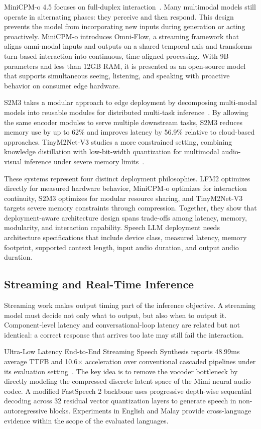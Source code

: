 MiniCPM-o 4.5 focuses on full-duplex interaction~\citep{cui2026minicpmo}. Many multimodal models still operate in alternating phases: they perceive and then respond. This design prevents the model from incorporating new inputs during generation or acting proactively. MiniCPM-o introduces Omni-Flow, a streaming framework that aligns omni-modal inputs and outputs on a shared temporal axis and transforms turn-based interaction into continuous, time-aligned processing. With 9B parameters and less than 12GB RAM, it is presented as an open-source model that supports simultaneous seeing, listening, and speaking with proactive behavior on consumer edge hardware.

S2M3 takes a modular approach to edge deployment by decomposing multi-modal models into reusable modules for distributed multi-task inference~\citep{yoon2025s2m3}. By allowing the same encoder modules to serve multiple downstream tasks, S2M3 reduces memory use by up to 62\% and improves latency by 56.9\% relative to cloud-based approaches. TinyM2Net-V3 studies a more constrained setting, combining knowledge distillation with low-bit-width quantization for multimodal audio-visual inference under severe memory limits~\citep{rashid2024tinym2net}.

These systems represent four distinct deployment philosophies. LFM2 optimizes directly for measured hardware behavior, MiniCPM-o optimizes for interaction continuity, S2M3 optimizes for modular resource sharing, and TinyM2Net-V3 targets severe memory constraints through compression. Together, they show that deployment-aware architecture design spans trade-offs among latency, memory, modularity, and interaction capability. Speech LLM deployment needs architecture specifications that include device class, measured latency, memory footprint, supported context length, input audio duration, and output audio duration.

\subsection{Streaming and Real-Time Inference}

Streaming work makes output timing part of the inference objective. A streaming model must decide not only what to output, but also when to output it. Component-level latency and conversational-loop latency are related but not identical: a correct response that arrives too late may still fail the interaction.

Ultra-Low Latency End-to-End Streaming Speech Synthesis reports 48.99ms average TTFB and 10.6$\times$ acceleration over conventional cascaded pipelines under its evaluation setting~\citep{su2026ultralowtts}. The key idea is to remove the vocoder bottleneck by directly modeling the compressed discrete latent space of the Mimi neural audio codec. A modified FastSpeech 2 backbone uses progressive depth-wise sequential decoding across 32 residual vector quantization layers to generate speech in non-autoregressive blocks. Experiments in English and Malay provide cross-language evidence within the scope of the evaluated languages.

